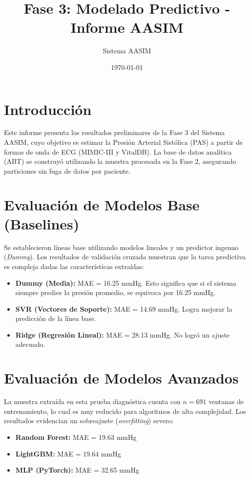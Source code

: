 \documentclass[11pt,a4paper]{article}
\title{\textbf{Fase 3: Modelado Predictivo - Informe AASIM}}
\author{Sistema AASIM}
\date{\today}
\begin{document}
\maketitle

\section{Introducción}
Este informe presenta los resultados preliminares de la Fase 3 del Sistema AASIM, cuyo objetivo es estimar la Presión Arterial Sistólica (PAS) a partir de formas de onda de ECG (MIMIC-III y VitalDB). La base de datos analítica (ABT) se construyó utilizando la muestra procesada en la Fase 2, asegurando particiones sin fuga de datos por paciente.

\section{Evaluación de Modelos Base (Baselines)}
Se establecieron líneas base utilizando modelos lineales y un predictor ingenuo (\textit{Dummy}). Los resultados de validación cruzada muestran que la tarea predictiva es compleja dadas las características extraídas:

\begin{itemize}
    \item \textbf{Dummy (Media):} MAE = 16.25 mmHg. Esto significa que si el sistema siempre predice la presión promedio, se equivoca por 16.25 mmHg.
    \item \textbf{SVR (Vectores de Soporte):} MAE = 14.69 mmHg. Logra mejorar la predicción de la línea base.
    \item \textbf{Ridge (Regresión Lineal):} MAE = 28.13 mmHg. No logró un ajuste adecuado.
\end{itemize}

\section{Evaluación de Modelos Avanzados}
La muestra extraída en esta prueba diagnóstica cuenta con $n=691$ ventanas de entrenamiento, lo cual es muy reducido para algoritmos de alta complejidad. Los resultados evidencian un sobreajuste (\textit{overfitting}) severo:

\begin{itemize}
    \item \textbf{Random Forest:} MAE = 19.63 mmHg
    \item \textbf{LightGBM:} MAE = 19.64 mmHg
    \item \textbf{MLP (PyTorch):} MAE = 32.65 mmHg
\end{itemize}
\end{document}
